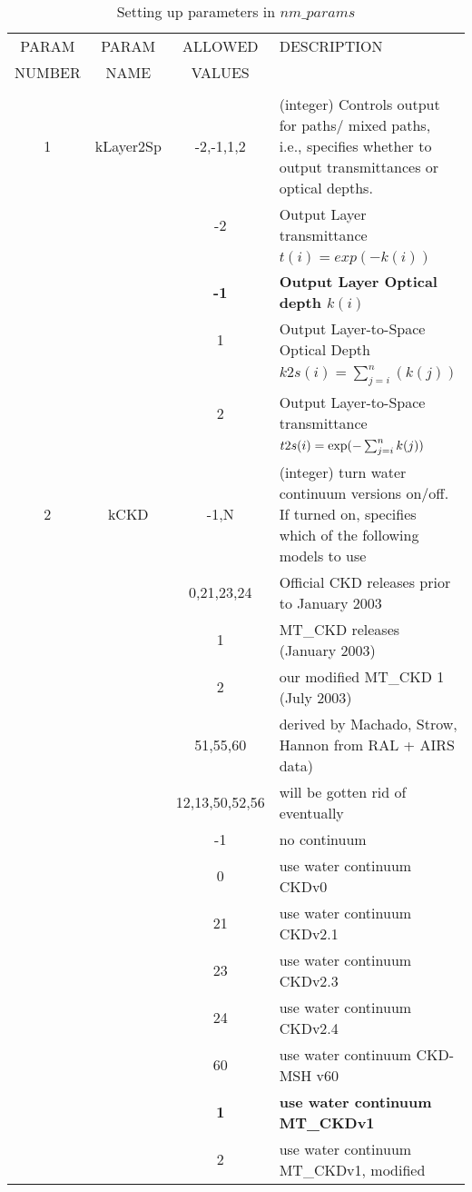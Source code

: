 \documentclass[12pt]{article}
\newlength{\colwidth}
\newlength{\colwidthshort}
\begin{document}
\begin{small}
\begin{longtable}{|c|c|c|p{\colwidthshort}|}
\caption{Setting up parameters in $nm\_params$}\\
\hline
PARAM  & PARAM & ALLOWED & DESCRIPTION\\
NUMBER & NAME  & VALUES  & \\
   &              &     & \\
\hline
1  & {\sf kLayer2Sp} & -2,-1,1,2 & (integer) Controls output for 
           paths/ mixed paths, i.e., specifies whether to output 
           transmittances or optical depths.\\
   &           &  -2  &    Output Layer transmittance  \\
   &           &      &    $t(i)=exp(-k(i))$\\
   &           & {\bf -1} & {\bf Output Layer Optical depth    $k(i)$}\\
   &           &    1 &    Output Layer-to-Space Optical Depth   \\
   &           &      &    $k2s(i)=\sum_{j=i}^{n}(k(j))$\\
   &           &    2 &    Output Layer-to-Space transmittance   \\
   &           &      &   $t2s(i)=\hbox{exp}(-\sum_{j=i}^{n}k(j))$\\ \hline

2  & {\sf kCKD} & -1,N    & (integer) turn water continuum versions 
on/off. If turned on, specifies which of the  following models to use \\
   & & 0,21,23,24 & Official CKD releases prior to January 2003\\
   & & 1 & MT\_CKD releases (January 2003)\\
   & & 2 & our modified MT\_CKD 1 (July 2003) \\
   & & 51,55,60 & derived by Machado, Strow, Hannon from RAL + AIRS data)\\
   & & 12,13,50,52,56 & will be gotten rid of eventually\\
   &           &  -1   & no continuum\\
   &           &   0   & use water continuum CKDv0 \\
   &           &   21  & use water continuum CKDv2.1\\
   &           &   23  & use water continuum CKDv2.3 \\ 
   &           &   24  & use water continuum CKDv2.4 \\ 
   &           &   60  & use water continuum CKD-MSH v60\\
   &           &   \bf{1}  & \bf{use water continuum MT\_CKDv1} \\
   &           &   2       & use water continuum MT\_CKDv1, modified \\ \hline


\end{longtable}
\end{small}
\end{document}
